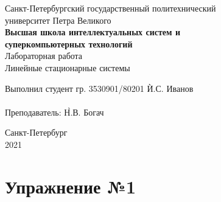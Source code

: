\documentclass[a4paper, 14pt]{extarticle}
\begin{document}
    \begin{center}
        \begin{center}
            \hfill \break
            \normalsize{Санкт-Петербургский государственный политехнический}\\
            \normalsize{университет Петра Великого}\\
            \hfill \break
            \normalsize{\textbf{Высшая школа интеллектуальных систем и}}\\
            \normalsize{\textbf{суперкомпьютерных технологий}}\\
            \hfill \break
            \hfill \break
            \hfill \break
            \normalsize{Лабораторная работа}\\
            \hfill \break
            \normalsize{\LARGE Линейные стационарные системы}\\
        \end{center}
        \hfill \break
        \hfill \break
        \hfill \break
        \hfill \break
        \hfill \break
        \hfill \break
        \hfill \break
        \hfill \break
        \hfill \break
        \hfill \break
        \begin{tabbing}
            Выполнил студент гр. 3530901/80201 \`И.С. Иванов\\
            \\
            Преподаватель: \`Н.В. Богач\\
        \end{tabbing}
        \hfill \break
        \hfill \break
        \hfill \break
        \hfill \break
        \begin{center}
            Санкт-Петербург\\
            2021
        \end{center}
        \thispagestyle{empty}
    \end{center}

    \newpage
    \tableofcontents

    \newpage
    \listoffigures

    \newpage
    \lstlistoflistings

    \newpage


    \section{Упражнение №1}
    \label{sec:1}
\end{document}
